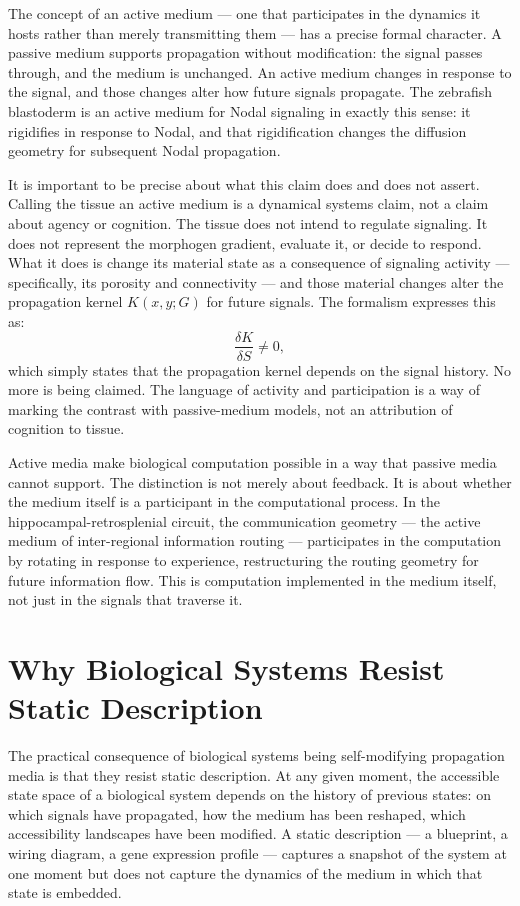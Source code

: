 \documentclass[12pt, a4paper, openany]{book}
\theoremstyle{definition}
\theoremstyle{remark}
\begin{document}
The concept of an active medium — one that participates in the dynamics it hosts rather than merely transmitting them — has a precise formal character. A passive medium supports propagation without modification: the signal passes through, and the medium is unchanged. An active medium changes in response to the signal, and those changes alter how future signals propagate. The zebrafish blastoderm is an active medium for Nodal signaling in exactly this sense: it rigidifies in response to Nodal, and that rigidification changes the diffusion geometry for subsequent Nodal propagation.

It is important to be precise about what this claim does and does not assert. Calling the tissue an active medium is a dynamical systems claim, not a claim about agency or cognition. The tissue does not intend to regulate signaling. It does not represent the morphogen gradient, evaluate it, or decide to respond. What it does is change its material state as a consequence of signaling activity — specifically, its porosity and connectivity — and those material changes alter the propagation kernel $K(x,y;G)$ for future signals. The formalism expresses this as:
\begin{equation}
\frac{\delta K}{\delta S} \neq 0,
\end{equation}
which simply states that the propagation kernel depends on the signal history. No more is being claimed. The language of activity and participation is a way of marking the contrast with passive-medium models, not an attribution of cognition to tissue.

Active media make biological computation possible in a way that passive media cannot support. The distinction is not merely about feedback. It is about whether the medium itself is a participant in the computational process. In the hippocampal-retrosplenial circuit, the communication geometry — the active medium of inter-regional information routing — participates in the computation by rotating in response to experience, restructuring the routing geometry for future information flow. This is computation implemented in the medium itself, not just in the signals that traverse it.

\section{Why Biological Systems Resist Static Description}

The practical consequence of biological systems being self-modifying propagation media is that they resist static description. At any given moment, the accessible state space of a biological system depends on the history of previous states: on which signals have propagated, how the medium has been reshaped, which accessibility landscapes have been modified. A static description — a blueprint, a wiring diagram, a gene expression profile — captures a snapshot of the system at one moment but does not capture the dynamics of the medium in which that state is embedded.
\end{document}

